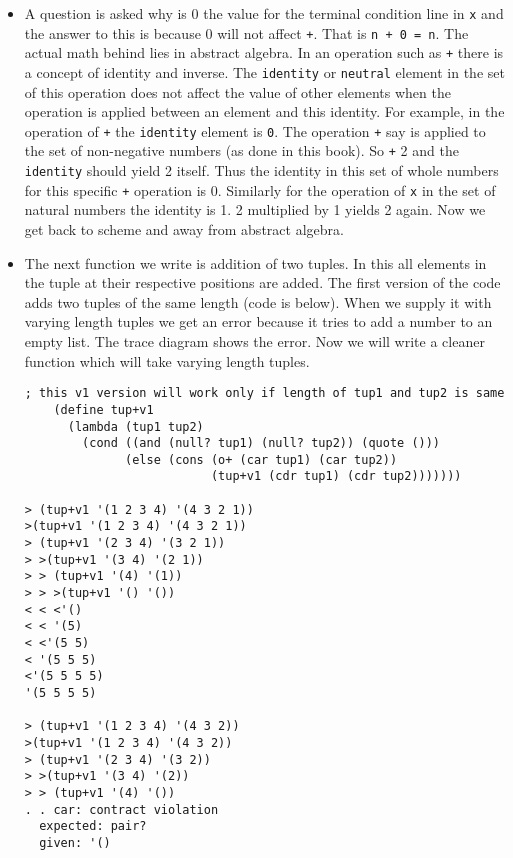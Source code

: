 \documentclass[11pt]{article}
\begin{document}
\begin{itemize}
\begin{verbatim}
\end{verbatim}

\item A question is asked why is 0 the value for the terminal condition line in \texttt{x} and the answer to this is because 0 will not affect \texttt{+}. That
is \texttt{n + 0 = n}. The actual math behind lies in abstract algebra. In an operation such as \texttt{+} there is a concept of identity and inverse. The
\texttt{identity} or \texttt{neutral} element in the set of this operation does not affect the value of other elements when the operation is applied between
an element and this identity. For example, in the operation of \texttt{+} the \texttt{identity} element is \texttt{0}. The operation \texttt{+} say is applied to the set
of non-negative numbers (as done in this book). So \texttt{+} 2 and the \texttt{identity} should yield 2 itself. Thus the identity in this set of whole
numbers for this specific \texttt{+} operation is 0. Similarly for the operation of \texttt{x} in the set of natural numbers the identity is 1. 2 multiplied
by 1 yields 2 again. Now we get back to scheme and away from abstract algebra.

\item The next function we write is addition of two tuples. In this all elements in the tuple at their respective positions are added. The first version
of the code adds two tuples of the same length (code is below). When we supply it with varying length tuples we get an error because it tries to
add a number to an empty list. The trace diagram shows the error. Now we will write a cleaner function which will take varying length tuples.
\begin{verbatim}
; this v1 version will work only if length of tup1 and tup2 is same
    (define tup+v1       
      (lambda (tup1 tup2)
        (cond ((and (null? tup1) (null? tup2)) (quote ()))
              (else (cons (o+ (car tup1) (car tup2))
                          (tup+v1 (cdr tup1) (cdr tup2)))))))

> (tup+v1 '(1 2 3 4) '(4 3 2 1))
>(tup+v1 '(1 2 3 4) '(4 3 2 1))
> (tup+v1 '(2 3 4) '(3 2 1))
> >(tup+v1 '(3 4) '(2 1))
> > (tup+v1 '(4) '(1))
> > >(tup+v1 '() '())
< < <'()
< < '(5)
< <'(5 5)
< '(5 5 5)
<'(5 5 5 5)
'(5 5 5 5)

> (tup+v1 '(1 2 3 4) '(4 3 2))
>(tup+v1 '(1 2 3 4) '(4 3 2))
> (tup+v1 '(2 3 4) '(3 2))
> >(tup+v1 '(3 4) '(2))
> > (tup+v1 '(4) '())
. . car: contract violation
  expected: pair?
  given: '()

\end{verbatim}


\end{itemize}
\end{document}

